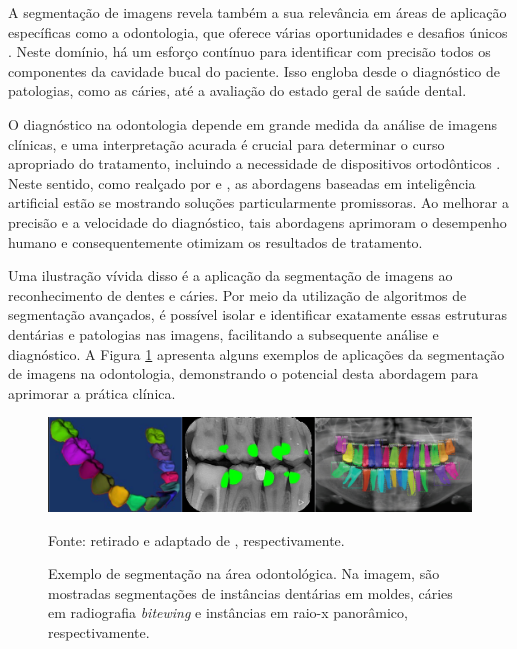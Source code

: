 A segmentação de imagens revela também a sua relevância em áreas de aplicação específicas como a odontologia, que oferece várias oportunidades e desafios únicos \citep{Ghazvinian2021,Minyoung2020}. Neste domínio, há um esforço contínuo para identificar com precisão todos os componentes da cavidade bucal do paciente. Isso engloba desde o diagnóstico de patologias, como as cáries, até a avaliação do estado geral de saúde dental.

O diagnóstico na odontologia depende em grande medida da análise de imagens clínicas, e uma interpretação acurada é crucial para determinar o curso apropriado do tratamento, incluindo a necessidade de dispositivos ortodônticos \citep{Schwendicke2020}. Neste sentido, como realçado por \cite{Bansal2021, Nguyen2021} e \cite{Schwendicke2020}, as abordagens baseadas em inteligência artificial estão se mostrando soluções particularmente promissoras. Ao melhorar a precisão e a velocidade do diagnóstico, tais abordagens aprimoram o desempenho humano e consequentemente otimizam os resultados de tratamento.

Uma ilustração vívida disso é a aplicação da segmentação de imagens ao reconhecimento de dentes e cáries. Por meio da utilização de algoritmos de segmentação avançados, é possível isolar e identificar exatamente essas estruturas dentárias e patologias nas imagens, facilitando a subsequente análise e diagnóstico. A Figura \ref{intro:fig:4} apresenta alguns exemplos de aplicações da segmentação de imagens na odontologia, demonstrando o potencial desta abordagem para aprimorar a prática clínica.

\begin{figure}[H]
    \centering
    \caption{Exemplo de segmentação na área odontológica. Na imagem, são mostradas segmentações de instâncias dentárias em moldes, cáries em radiografia \textit{bitewing} e instâncias em raio-x panorâmico, respectivamente.}
    \includegraphics[width=1\linewidth]{recursos/imagens/introduction/odonto_segmentation.png}
    \label{intro:fig:4}

    Fonte: retirado e adaptado de \cite{Shuai2016,Bayrakdar2021,Gil2019}, respectivamente.
\end{figure}

